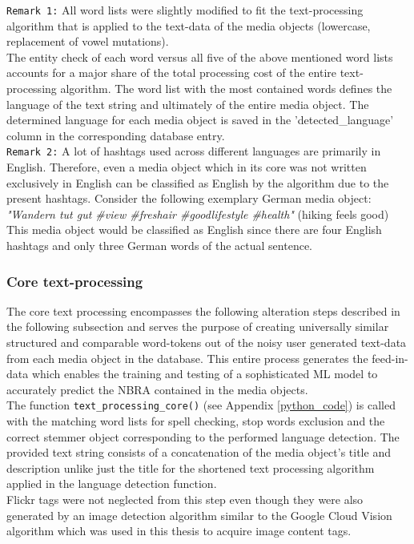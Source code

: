 \newline
\texttt{Remark 1:} All word lists were slightly modified to fit the text-processing algorithm that is applied to the text-data of the media objects (lowercase, replacement of vowel mutations).\\
\newline
The entity check of each word versus all five of the above mentioned word lists accounts for a major share of the total processing cost of the entire text-processing algorithm. The word list with the most contained words defines the language of the text string and ultimately of the entire media object. The determined language for each media object is saved in the 'detected\_language' column in the corresponding database entry.\\
\newline
\texttt{Remark 2:} A lot of hashtags used across different languages are primarily in English. Therefore, even a media object which in its core was not written exclusively in English can be classified as English by the algorithm due to the present hashtags. Consider the following exemplary German media object: \\ \textit{"Wandern tut gut \#view \#freshair \#goodlifestyle \#health"} (hiking feels good) \\ This media object would be classified as English since there are four English hashtags and only three German words of the actual sentence.

\subsubsection*{Core text-processing} \label{core_text_processing}
The core text processing encompasses the following alteration steps described in the following subsection and serves the purpose of creating universally similar structured and comparable word-tokens out of the noisy user generated text-data from each media object in the database. This entire process generates the feed-in-data which enables the training and testing of a sophisticated ML model to accurately predict the NBRA contained in the media objects.\\
The function \texttt{text\_processing\_core()} (see Appendix \ref{python_code}) is called with the matching word lists for spell checking, stop words exclusion and the correct stemmer object corresponding to the performed language detection. The provided text string consists of a concatenation of the media object's title and description unlike just the title for the shortened text processing algorithm applied in the language detection function.\\
Flickr tags were not neglected from this step even though they were also generated by an image detection algorithm similar to the Google Cloud Vision algorithm which was used in this thesis to acquire image content tags.


